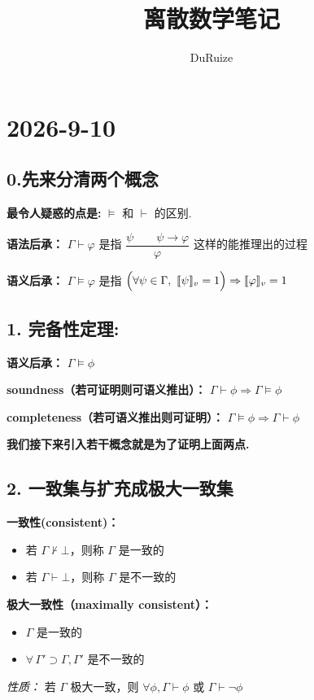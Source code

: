 \documentclass[12pt, a4paper]{article}
\begin{document}
\title{离散数学笔记}
\author{DuRuize}
\date{}
\maketitle
\setlength{\parindent}{0pt}

\newpage
\section*{2026-9-10}
\subsection*{0.先来分清两个概念}
\textbf{最令人疑惑的点是:} $\models$ 和 $\vdash$ 的区别.

\textbf{语法后承：} $\Gamma \vdash \varphi$ 是指 $\dfrac{\psi \qquad \psi\to\varphi}{\varphi}$ 这样的能推理出的过程

\textbf{语义后承：} $\Gamma \models \varphi$ 是指 $\Bigl(\forall \psi \in \Gamma,\ \llbracket \psi \rrbracket_v = 1\Bigr) \Rightarrow \llbracket \varphi \rrbracket_v = 1$

\subsection*{1. 完备性定理:}

\textbf{语义后承：} $\Gamma \models \phi$

\textbf{soundness（若可证明则可语义推出）：} $\Gamma \vdash \phi \Rightarrow \Gamma \models \phi$

\textbf{completeness（若可语义推出则可证明）：} $\Gamma \models \phi \Rightarrow \Gamma \vdash \phi$

\textbf{我们接下来引入若干概念就是为了证明上面两点.}

\subsection*{2. 一致集与扩充成极大一致集}
\vspace{0.3cm}
\textbf{一致性(consistent)：}
\begin{itemize}
    \item 若 $\Gamma \nvdash \bot$，则称 $\Gamma$ 是一致的
    \item 若 $\Gamma \vdash \bot$，则称 $\Gamma$ 是不一致的
\end{itemize}

\textbf{极大一致性（maximally consistent）：}
\begin{itemize}
    \item $\Gamma$ 是一致的
    \item $\forall \, \Gamma' \supset \Gamma, \Gamma'$ 是不一致的
\end{itemize}
\textit{性质：} 若 $\Gamma$ 极大一致，则 $\forall \phi, \Gamma \vdash \phi \text{ 或 } \Gamma \vdash \neg \phi$
\end{document}
